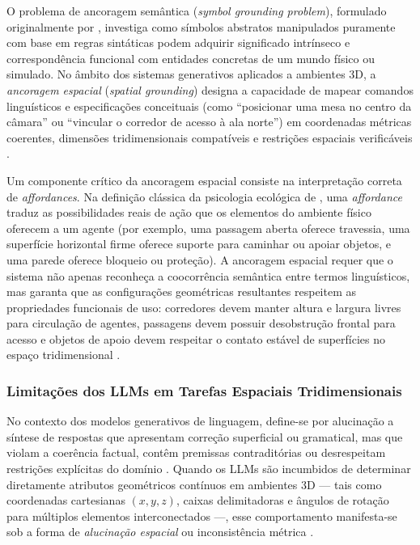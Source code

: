O problema de ancoragem semântica (\textit{symbol grounding problem}), formulado originalmente por \textcite{harnad1990symbol}, investiga como símbolos abstratos manipulados puramente com base em regras sintáticas podem adquirir significado intrínseco e correspondência funcional com entidades concretas de um mundo físico ou simulado. No âmbito dos sistemas generativos aplicados a ambientes 3D, a \textit{ancoragem espacial} (\textit{spatial grounding}) designa a capacidade de mapear comandos linguísticos e especificações conceituais (como ``posicionar uma mesa no centro da câmara'' ou ``vincular o corredor de acesso à ala norte'') em coordenadas métricas coerentes, dimensões tridimensionais compatíveis e restrições espaciais verificáveis \cite{harnad1990symbol, hu2024scenecraft, sun2024roomplanner, chen2025narrative}.

Um componente crítico da ancoragem espacial consiste na interpretação correta de \textit{affordances}. Na definição clássica da psicologia ecológica de \textcite{gibson1979ecological}, uma \textit{affordance} traduz as possibilidades reais de ação que os elementos do ambiente físico oferecem a um agente (por exemplo, uma passagem aberta oferece travessia, uma superfície horizontal firme oferece suporte para caminhar ou apoiar objetos, e uma parede oferece bloqueio ou proteção). A ancoragem espacial requer que o sistema não apenas reconheça a coocorrência semântica entre termos linguísticos, mas garanta que as configurações geométricas resultantes respeitem as propriedades funcionais de uso: corredores devem manter altura e largura livres para circulação de agentes, passagens devem possuir desobstrução frontal para acesso e objetos de apoio devem respeitar o contato estável de superfícies no espaço tridimensional \cite{gibson1979ecological, chen2025narrative}.

\subsubsection{Limitações dos LLMs em Tarefas Espaciais Tridimensionais}
\label{sec:limitacoes_espaciais_llms}

No contexto dos modelos generativos de linguagem, define-se por alucinação a síntese de respostas que apresentam correção superficial ou gramatical, mas que violam a coerência factual, contêm premissas contraditórias ou desrespeitam restrições explícitas do domínio \cite{Gallotta_2024, xu2025constraint, bandeali2026generative}. Quando os LLMs são incumbidos de determinar diretamente atributos geométricos contínuos em ambientes 3D --- tais como coordenadas cartesianas $(x, y, z)$, caixas delimitadoras e ângulos de rotação para múltiplos elementos interconectados ---, esse comportamento manifesta-se sob a forma de \textit{alucinação espacial} ou inconsistência métrica \cite{Gallotta_2024, sun2024roomplanner, yang2026codeasroomgenerating3drooms, feng2026repurposing3dgenerativemodel}.

